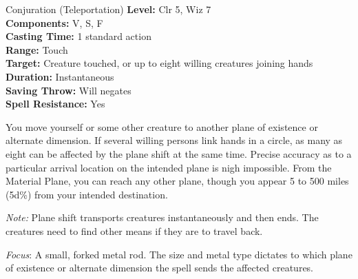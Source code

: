 {Conjuration (Teleportation)}
{
	\textbf{Level:}
	Clr 5, Wiz 7\\
	\textbf{Components:}
	V, S, F\\
	\textbf{Casting Time:}
	1 standard action\\
	\textbf{Range:}
	Touch\\
	\textbf{Target:}
	Creature touched, or up to eight willing creatures joining hands\\
	\textbf{Duration:}
	Instantaneous\\
	\textbf{Saving Throw:}
	Will negates\\
	\textbf{Spell Resistance:}
	Yes\\
}
{
	You move yourself or some other creature to another plane of existence or alternate dimension. If several willing persons link hands in a circle, as many as eight can be affected by the plane shift at the same time. Precise accuracy as to a particular arrival location on the intended plane is nigh impossible. From the Material Plane, you can reach any other plane, though you appear 5 to 500 miles (5d\%) from your intended destination.

	\textit{Note:} Plane shift transports creatures instantaneously and then ends. The creatures need to find other means if they are to travel back.

	\textit{Focus}:
	A small, forked metal rod. The size and metal type dictates to which plane of existence or alternate dimension the spell sends the affected creatures.

}
